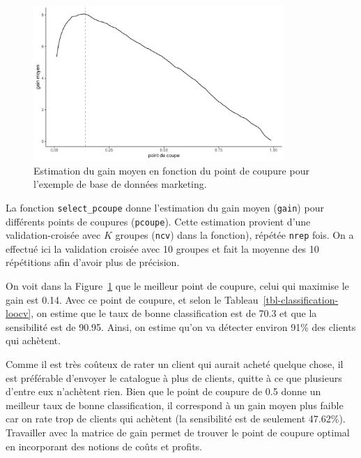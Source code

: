\documentclass[
  11pt,
  letterpaper,
]{scrbook}
\theoremstyle{definition}
\theoremstyle{remark}
\begin{document}
\begin{figure}[ht!]

{\centering \includegraphics[width=0.85\textwidth,height=\textheight]{reglogistique_files/figure-pdf/fig-coupure-pondere-1.pdf}

}

\caption{\label{fig-coupure-pondere}Estimation du gain moyen en fonction
du point de coupure pour l'exemple de base de données marketing.}

\end{figure}

La fonction \texttt{select\_pcoupe} donne l'estimation du gain moyen
(\texttt{gain}) pour différents points de coupures (\texttt{pcoupe}).
Cette estimation provient d'une validation-croisée avec \(K\) groupes
(\texttt{ncv}) dans la fonction), répétée \texttt{nrep} fois. On a
effectué ici la validation croisée avec 10 groupes et fait la moyenne
des 10 répétitions afin d'avoir plus de précision.

On voit dans la Figure~\ref{fig-coupure-pondere} que le meilleur point
de coupure, celui qui maximise le gain est 0.14. Avec ce point de
coupure, et selon le Tableau~\ref{tbl-classification-loocv}, on estime
que le taux de bonne classification est de 70.3 et que la sensibilité
est de 90.95. Ainsi, on estime qu'on va détecter environ 91\% des
clients qui achètent.

Comme il est très coûteux de rater un client qui aurait acheté quelque
chose, il est préférable d'envoyer le catalogue à plus de clients,
quitte à ce que plusieurs d'entre eux n'achètent rien. Bien que le point
de coupure de 0.5 donne un meilleur taux de bonne classification, il
correspond à un gain moyen plus faible car on rate trop de clients qui
achètent (la sensibilité est de seulement 47.62\%). Travailler avec la
matrice de gain permet de trouver le point de coupure optimal en
incorporant des notions de coûts et profits.
\end{document}
